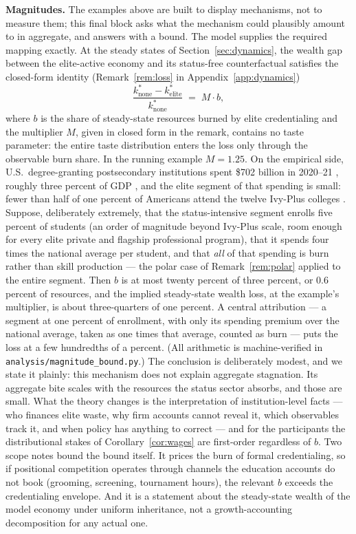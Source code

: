 \documentclass[12pt,letterpaper]{article}
\theoremstyle{definition}
\begin{document}
\textbf{Magnitudes.}
The examples above are built to display mechanisms, not to measure them; this final block asks what the mechanism could plausibly amount to in aggregate, and answers with a bound.
The model supplies the required mapping exactly.
At the steady states of Section~\ref{sec:dynamics}, the wealth gap between the elite-active economy and its status-free counterfactual satisfies the closed-form identity (Remark~\ref{rem:loss} in Appendix~\ref{app:dynamics})
\[
\frac{k^\ast_{\mathrm{none}}-k^\ast_{\mathrm{elite}}}{k^\ast_{\mathrm{none}}} \;=\; M\cdot b,
\]
where $b$ is the share of steady-state resources burned by elite credentialing and the multiplier $M$, given in closed form in the remark, contains no taste parameter: the entire taste distribution enters the loss only through the observable burn share.
In the running example $M=1.25$.
On the empirical side, U.S.\ degree-granting postsecondary institutions spent \$702 billion in 2020--21 \citep{nces2023expenses}, roughly three percent of GDP \citep{bea2022gdp}, and the elite segment of that spending is small: fewer than half of one percent of Americans attend the twelve Ivy-Plus colleges \citep{chettydemingfriedman2026}.
Suppose, deliberately extremely, that the status-intensive segment enrolls five percent of students (an order of magnitude beyond Ivy-Plus scale, room enough for every elite private and flagship professional program), that it spends four times the national average per student, and that \emph{all} of that spending is burn rather than skill production --- the polar case of Remark~\ref{rem:polar} applied to the entire segment.
Then $b$ is at most twenty percent of three percent, or $0.6$ percent of resources, and the implied steady-state wealth loss, at the example's multiplier, is about three-quarters of one percent.
A central attribution --- a segment at one percent of enrollment, with only its spending premium over the national average, taken as one times that average, counted as burn --- puts the loss at a few hundredths of a percent.
(All arithmetic is machine-verified in \texttt{analysis/magnitude\_bound.py}.)
The conclusion is deliberately modest, and we state it plainly: this mechanism does not explain aggregate stagnation.
Its aggregate bite scales with the resources the status sector absorbs, and those are small.
What the theory changes is the interpretation of institution-level facts --- who finances elite waste, why firm accounts cannot reveal it, which observables track it, and when policy has anything to correct --- and for the participants the distributional stakes of Corollary~\ref{cor:wages} are first-order regardless of $b$.
Two scope notes bound the bound itself.
It prices the burn of formal credentialing, so if positional competition operates through channels the education accounts do not book (grooming, screening, tournament hours), the relevant $b$ exceeds the credentialing envelope.
And it is a statement about the steady-state wealth of the model economy under uniform inheritance, not a growth-accounting decomposition for any actual one.
\end{document}

